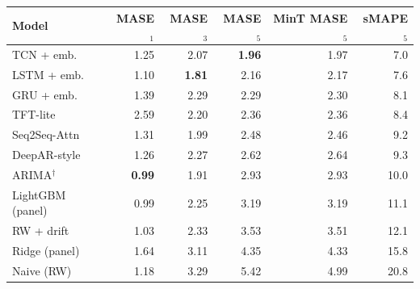 \begin{tabular}{lrrrrr}
\toprule
Model & MASE$_1$ & MASE$_3$ & MASE$_5$ & MinT MASE$_5$ & sMAPE$_5$ \\
\midrule
TCN + emb. & 1.25 & 2.07 & \textbf{1.96} & 1.97 & 7.0 \\
LSTM + emb. & 1.10 & \textbf{1.81} & 2.16 & 2.17 & 7.6 \\
GRU + emb. & 1.39 & 2.29 & 2.29 & 2.30 & 8.1 \\
TFT-lite & 2.59 & 2.20 & 2.36 & 2.36 & 8.4 \\
Seq2Seq-Attn & 1.31 & 1.99 & 2.48 & 2.46 & 9.2 \\
DeepAR-style & 1.26 & 2.27 & 2.62 & 2.64 & 9.3 \\
ARIMA$^\dagger$ & \textbf{0.99} & 1.91 & 2.93 & 2.93 & 10.0 \\
LightGBM (panel) & 0.99 & 2.25 & 3.19 & 3.19 & 11.1 \\
RW + drift & 1.03 & 2.33 & 3.53 & 3.51 & 12.1 \\
Ridge (panel) & 1.64 & 3.11 & 4.35 & 4.33 & 15.8 \\
Naive (RW) & 1.18 & 3.29 & 5.42 & 4.99 & 20.8 \\
\bottomrule
\end{tabular}
